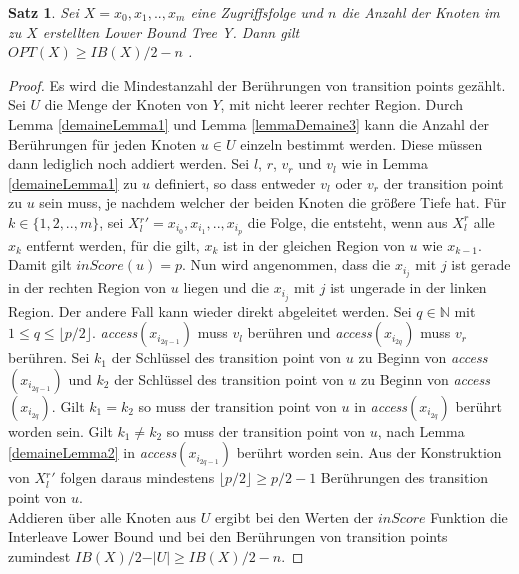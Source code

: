 \documentclass[a4paper,12pt]{article}
\newtheorem{Satz}{Satz}[section]
\begin{document}
\begin{Satz} \label{satzDemaine1}
	Sei $X = x_0, x_1,.., x_m$  eine Zugriffsfolge und $n$ die Anzahl der Knoten im zu $X$ erstellten Lower Bound Tree Y. Dann gilt\\	
	$\mathit{OPT}\left(X\right) \geq \mathit{IB}\left(X\right) /2 - n$ .
\end{Satz}
\begin{proof}
	Es wird die Mindestanzahl der Berührungen von transition points gezählt. Sei $U$ die Menge der Knoten von $Y$, mit nicht leerer rechter Region. Durch Lemma \ref{demaineLemma1} und Lemma \ref{lemmaDemaine3} kann die Anzahl der Berührungen für jeden Knoten $u \in U$ einzeln bestimmt werden. Diese müssen dann lediglich noch addiert werden. Sei $l$, $r$, $v_r$ und $v_l$ wie in Lemma \ref{demaineLemma1} zu $u$ definiert, so dass entweder $v_l$ oder $v_r$ der transition point zu $u$ sein muss, je nachdem welcher der beiden Knoten die größere Tiefe hat. Für $k \in \{1, 2,.., m\}$, sei \mbox{$X{^r_l}' = x_{i_0},x_{i_1},..,x_{i_p}$} die Folge, die entsteht, wenn aus $X^r_l$ alle $x_k$ entfernt werden, für die gilt, $x_k$ ist in der gleichen Region von $u$ wie $x_{k-1}$. Damit gilt $\mathit{inScore}\left(u\right) = p$. Nun wird angenommen, dass die $x_{i_j}$ mit $j$ ist gerade in der rechten Region von $u$ liegen und die $x_{i_j}$ mit $j$ ist ungerade in der linken Region. Der andere Fall kann wieder direkt abgeleitet werden. Sei $q \in \mathbb{N}$ mit $1 \leq q \leq \lfloor p / 2 \rfloor$. \textit{access}$\left( x_{i_{2q-1}} \right)$ muss $v_l$ berühren und \textit{access}$\left( x_{i_{2q}} \right)$ muss $v_r$ berühren. Sei $k_{1}$ der Schlüssel des transition point von $u$ zu Beginn von \textit{access}$\left( x_{i_{2q-1}} \right)$ und  $k_{2}$ der Schlüssel des transition point von $u$ zu Beginn von \textit{access}$\left( x_{i_{2q}} \right)$. Gilt $k_{1} = k_{2}$ so muss der transition point von $u$ in \textit{access}$\left( x_{i_{2q}} \right)$ berührt worden sein.  Gilt $k_{1} \ne k_{2}$ so muss der transition point von $u$, nach Lemma \ref{demaineLemma2} in \textit{access}$\left( x_{i_{2q-1}} \right)$ berührt worden sein. Aus der Konstruktion von $X{^r_l}'$ folgen daraus mindestens $\lfloor p/2 \rfloor \geq p/2 - 1$ Berührungen des transition point von $u$. \\
	Addieren über alle Knoten aus $U$ ergibt bei den Werten der $\mathit{inScore}$ Funktion die Interleave Lower Bound und bei den Berührungen von transition points zumindest  $\mathit{IB}\left(X\right) /2 - \vert U \vert \geq \mathit{IB}\left(X\right) /2 - n$.
	
\end{proof}
\end{document}
